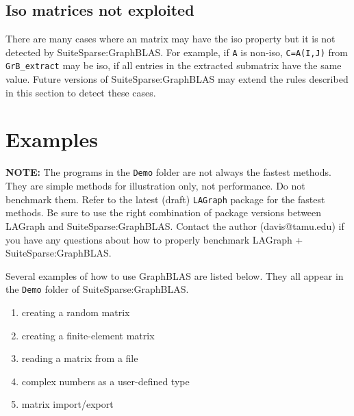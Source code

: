 \documentclass[12pt]{article}
\begin{document}
\subsection{Iso matrices not exploited}

There are many cases where an matrix may have the iso property but it is not
detected by SuiteSparse:GraphBLAS.  For example, if \verb'A' is non-iso,
\verb'C=A(I,J)' from \verb'GrB_extract' may be iso, if all entries in the
extracted submatrix have the same value.  Future versions of
SuiteSparse:GraphBLAS may extend the rules described in this section to detect
these cases.

\newpage
\section{Examples} %
\label{examples}

\begin{alert}
{\bf NOTE:} The programs in the \verb'Demo' folder are not always the fastest
methods.  They are simple methods for illustration only, not performance.  Do
not benchmark them.  Refer to the latest (draft) \verb'LAGraph' package for the
fastest methods.  Be sure to use the right combination of package versions
between LAGraph and SuiteSparse:GraphBLAS.  Contact the author (davis@tamu.edu)
if you have any questions about how to properly benchmark LAGraph +
SuiteSparse:GraphBLAS.
\end{alert}

Several examples of how to use GraphBLAS are listed below.  They all
appear in the \verb'Demo' folder of SuiteSparse:GraphBLAS.

\begin{enumerate}
\item creating a random matrix
\item creating a finite-element matrix
\item reading a matrix from a file
\item complex numbers as a user-defined type
\item matrix import/export
\end{enumerate}
\end{document}
